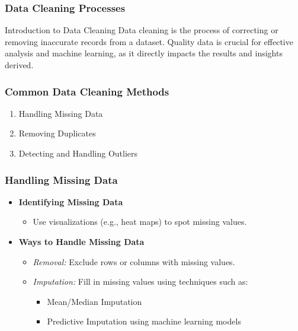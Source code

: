 \documentclass[aspectratio=169]{beamer}
\begin{document}
\begin{frame}
    \frametitle{Data Cleaning Processes}
    \begin{block}{Introduction to Data Cleaning}
        Data cleaning is the process of correcting or removing inaccurate records from a dataset. 
        Quality data is crucial for effective analysis and machine learning, as it directly impacts the results and insights derived.
    \end{block}
\end{frame}

\begin{frame}
    \frametitle{Common Data Cleaning Methods}
    \begin{enumerate}
        \item Handling Missing Data
        \item Removing Duplicates
        \item Detecting and Handling Outliers
    \end{enumerate}
\end{frame}

\begin{frame}[fragile]
    \frametitle{Handling Missing Data}
    \begin{itemize}
        \item \textbf{Identifying Missing Data}
        \begin{itemize}
            \item Use visualizations (e.g., heat maps) to spot missing values.
        \end{itemize}
        \item \textbf{Ways to Handle Missing Data}
        \begin{itemize}
            \item \textit{Removal:} Exclude rows or columns with missing values.
            \item \textit{Imputation:} Fill in missing values using techniques such as:
            \begin{itemize}
                \item Mean/Median Imputation
                \item Predictive Imputation using machine learning models
            \end{itemize}
        \end{itemize}
    \end{itemize}
\end{frame}
\end{document}
